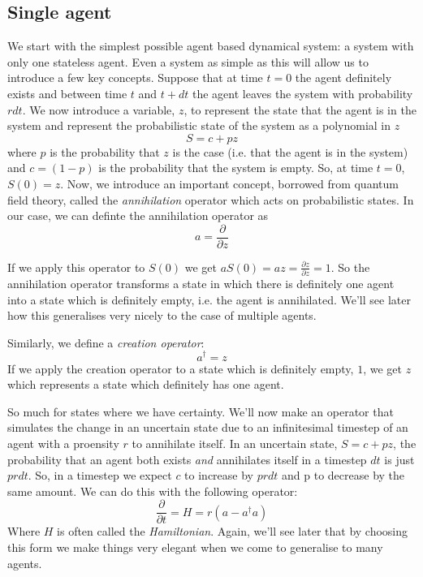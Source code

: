 \documentclass[letterpaper,twocolumn,10pt]{article}
\begin{document}
\subsection{Single agent}
We start with the simplest possible agent based dynamical system: a system with only one stateless agent. Even a system as simple as this will allow us to introduce a few key concepts. Suppose that at time $t=0$ the agent definitely exists and between time $t$ and $t+dt$ the agent leaves the system with probability $rdt$. We now introduce a variable, $z$, to represent the state that the agent is in the system and represent the probabilistic state of the system as a polynomial in $z$
\[
S = c + pz
\]
where $p$ is the probability that $z$ is the case (i.e. that the agent is in the system) and $c = (1-p)$ is the probability that the system is empty. So, at time $t=0$, $S(0) = z$. Now, we introduce an important concept, borrowed from quantum field theory, called the \textit{annihilation} operator which acts on probabilistic states. In our case, we can definte the annihilation operator as
\[
a = \frac{\partial}{\partial z}
\]

If we apply this operator to $S(0)$ we get $aS(0) = az = \frac{\partial z}{\partial z} = 1$. So the annihilation operator transforms a state in which there is definitely one agent into a state which is definitely empty, i.e. the agent is annihilated. We'll see later how this generalises very nicely to the case of multiple agents.

Similarly, we define a \textit{creation operator}:
\[
a^{\dag} = z
\]
If we apply the creation operator to a state which is definitely empty, $1$, we get $z$ which represents a state which definitely has one agent.

So much for states where we have certainty. We'll now make an operator that simulates the change in an uncertain state due to an infinitesimal timestep of an agent with a proensity $r$ to annihilate itself. In an uncertain state, $S = c + pz$, the probability that an agent both exists \textit{and} annihilates itself in a timestep $dt$ is just $prdt$. So, in a timestep we expect $c$ to increase by $prdt$ and p to decrease by the same amount. We can do this with the following operator:
\[
\frac{\partial}{\partial t} = H = r(a - a^{\dag}a)
\]
Where $H$ is often called the \textit{Hamiltonian}. Again, we'll see later that by choosing this form we make things very elegant when we come to generalise to many agents.
\end{document}
